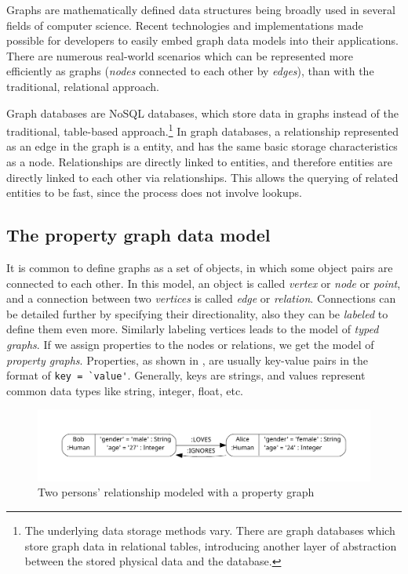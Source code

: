 Graphs are mathematically defined data structures being broadly used in several fields of computer science. Recent technologies and implementations made possible for developers to easily embed graph data models into their applications. There are numerous real-world scenarios which can be represented more efficiently as graphs (\emph{nodes} connected to each other by \emph{edges}), than with the traditional, relational approach.

Graph databases are NoSQL databases, which store data in graphs instead of the traditional, table-based approach.\footnote{The underlying data storage methods vary. There are graph databases which store graph data in relational tables, introducing another layer of abstraction between the stored physical data and the database.} In graph databases, a relationship represented as an edge in the graph is a  entity, and has the same basic storage characteristics as a node. Relationships are directly linked to entities, and therefore entities are directly linked to each other via relationships. This allows the querying of related entities to be fast, since the process does not involve lookups.

\subsection{The property graph data model}

It is common to define graphs as a set of objects, in which some object pairs are connected to each other. In this model, an object is called \emph{vertex} or \emph{node} or \emph{point}, and a connection between two \emph{vertices} is called \emph{edge} or \emph{relation}. Connections can be detailed further by specifying their directionality, also they can be \emph{labeled} to define them even more. Similarly labeling vertices leads to the model of \emph{typed graphs}. If we assign properties to the nodes or relations, we get the model of \emph{property graphs}. Properties, as shown in , are usually key-value pairs in the format of \lstinline{key = `value'}. Generally, keys are strings, and values represent common data types like string, integer, float, etc.

\begin{figure}[!htb]
    \centering
    \includegraphics[width=\textwidth, trim=12mm 12mm 12mm 12mm,clip]{figures/property-graph.pdf}
    \caption{Two persons' relationship modeled with a property graph}
    \label{fig:property-graph}
\end{figure}

